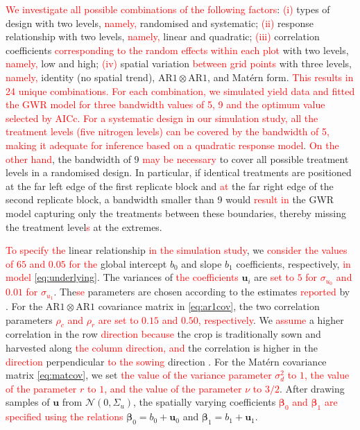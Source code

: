 \documentclass[a4paper]{article} 	%
\newcommand{\Matern}{Mat\'ern }
\newcommand{\N}{\mathcal{N}}
\newcommand{\AR}{\mathrm{AR1}}
\newcommand{\revision}[1]{\textcolor{red}{#1}}
\newcommand{\zc}[1]{\textcolor{red}{#1}}
\begin{document}
\zc{We investigate \revision{all possible} combination\revision{s} of the following factors}: \revision{(i)} types of design with two levels, \revision{namely,} randomised and systematic; \revision{(ii)} response relationship with two levels, \revision{namely,} linear and quadratic; \revision{(iii)} correlation coefficients \revision{corresponding to the random effects within each plot} with two levels, \revision{namely,} low and high; \revision{(iv)} spatial variation \revision{between grid points} with three levels, \revision{namely,} identity (no spatial trend), $\AR\otimes\AR$, and \Matern form. \zc{This results in \revision{24} unique combinations. For each combination, we simulated yield data and fitted the GWR model for three bandwidth values of 5, 9 and the optimum \revision{value selected} by AICc.} \revision{For a systematic design in our simulation study, all the treatment levels (five nitrogen levels) can be covered by the bandwidth of 5, making it adequate for inference based on a quadratic response model}. \revision{On the other hand}, the bandwidth of 9 \revision{may be necessary} to cover all possible treatment levels in a randomised design. In particular, if identical treatments are positioned at the far left edge of the first replicate block and \revision{at} the far right edge of the second replicate block, a bandwidth smaller than 9 would  \revision{result in} the GWR model capturing only the treatments between these boundaries, thereby missing the treatment level\revision{s} at the extremes.


\revision{To specify the} linear relationship \revision{in the simulation study}, we \revision{consider the values of $65$ and $0.05$ for the} global intercept $b_0$ and slope $b_1$ coefficients, respectively, \zc{in model \eqref{eq:underlying}}. The variances of \revision{the coefficients} $\bm{u}_i$ are \revision{set to $5$ for $\sigma_{u_0}$ and $0.01$ for $\sigma_{u_1}$}. The\revision{se} parameters are chosen according to the estimates \revision{reported} by \textcite{Cao2022Bayesian}. For the $\AR\otimes\AR$ covariance matrix in \eqref{eq:ar1cov}, the two correlation parameters \revision{$\rho_c$ and $\rho_r$ are set to $0.15$ and $0.50$, respectively}. We \revision{assume} a higher correlation in the row \revision{direction because} the crop is traditionally sown and harvested along \revision{the column direction,} \revision{and} the correlation is higher in the \revision{direction} perpendicular \revision{to the sowing} direction \parencite{Marchant2019Establishinga}. For the \Matern covariance matrix \eqref{eq:matcov}, we set \revision{the value of the variance parameter $\sigma_d^2$ to $1$, the value of the parameter $r$ to $1$, and the value of the parameter $\nu$ to $3/2$}. After drawing samples of $\bm{u}$ from $\N(0,\Sigma_u)$, the spatially varying coefficients \revision{$\bm{\beta}_0$ and $\bm{\beta}_1$ are specified using the relations} $\bm{\beta}_0 = b_0 + \bm{u}_0$ and $\bm{\beta}_1 = b_1 + \bm{u}_1$. 
\end{document}
